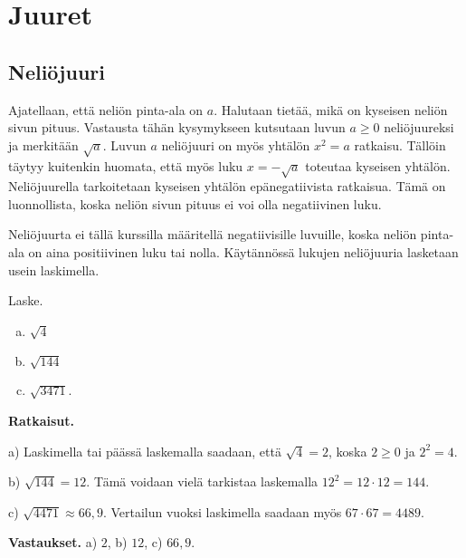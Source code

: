 \chapter{Juuret}

\section{Neliöjuuri}

Ajatellaan, että neliön pinta-ala on $a$. Halutaan tietää, mikä on kyseisen neliön sivun pituus. Vastausta tähän kysymykseen kutsutaan luvun $a\ge 0$ neliöjuureksi ja merkitään $\sqrt{a}$. Luvun $a$ neliöjuuri on myös yhtälön $x^2 = a$ ratkaisu. Tällöin täytyy kuitenkin huomata, että myös luku $x=-\sqrt{a}$ toteutaa kyseisen yhtälön. Neliöjuurella tarkoitetaan kyseisen yhtälön epänegatiivista ratkaisua. Tämä on luonnollista, koska neliön sivun pituus ei voi olla negatiivinen luku.


Neliöjuurta ei tällä kurssilla määritellä negatiivisille luvuille, koska neliön pinta-ala on aina positiivinen luku tai nolla. Käytännössä lukujen neliöjuuria lasketaan usein laskimella.


\begin{esimerkki}
Laske.
\begin{enumerate}[a)]
\item $\sqrt{4}$

\item $\sqrt{144}$

\item $\sqrt{3471}$.
\end{enumerate}

{\bf Ratkaisut.}

a)
Laskimella tai päässä laskemalla saadaan, että $\sqrt{4} = 2$, koska $2\geq0$ ja $2^2 =4$.

b) 
$\sqrt{144}=12$. Tämä voidaan vielä tarkistaa laskemalla $12^2 = 12\cdot 12=144$.

c)
$\sqrt{4471}\approx 66,9$. Vertailun vuoksi laskimella saadaan myös $67\cdot 67=4489$.

{\bf Vastaukset.}
a) $2$, b) $12$, c) $66,9$.

\end{esimerkki}

